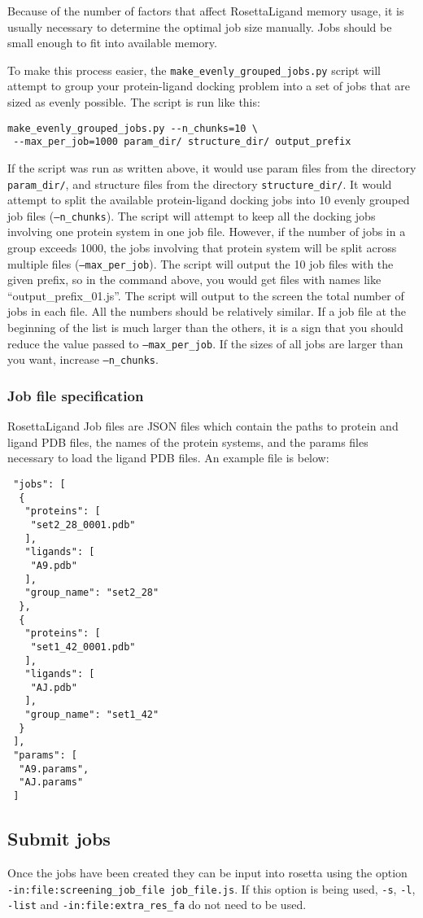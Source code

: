 Because of the number of factors that affect RosettaLigand memory usage, it is usually necessary to determine the optimal job size manually.
Jobs should be small enough to fit into available memory.

To make this process easier, the \texttt{make\_evenly\_grouped\_jobs.py} script will attempt to group your protein-ligand docking problem into a set of jobs that are sized as evenly possible. 
The script is run like this:

\begin{verbatim}
make_evenly_grouped_jobs.py --n_chunks=10 \
 --max_per_job=1000 param_dir/ structure_dir/ output_prefix
\end{verbatim}

If the script was run as written above, it would use param files from the directory \texttt{param\_dir/}, and structure files from the directory \texttt{structure\_dir/}.
It would attempt to split the available protein-ligand docking jobs into 10 evenly grouped job files (\texttt{--n\_chunks}).
The script will attempt to keep all the docking jobs involving one protein system in one job file. However, if the number of jobs in a group exceeds 1000,
the jobs involving that protein system will be split across multiple files (\texttt{--max\_per\_job}). 
The script will output the 10 job files with the given prefix, so in the command above, you would get files with names like ``output\_prefix\_01.js''.
The script will output to the screen the total number of jobs in each file. All the numbers should be relatively similar. 
If a job file at the beginning of the list is much larger than the others, it is a sign that you should reduce the value passed to \texttt{--max\_per\_job}. If the sizes of all jobs are larger than you want, increase \texttt{--n\_chunks}.

\subsubsection{Job file specification}

RosettaLigand Job files are JSON files which contain the paths to protein and ligand PDB files, the names of the protein systems,
and the params files necessary to load the ligand PDB files.
An example file is below:

\begin{verbatim}
 "jobs": [
  {
   "proteins": [
    "set2_28_0001.pdb"
   ],
   "ligands": [
    "A9.pdb"
   ],
   "group_name": "set2_28"
  },
  {
   "proteins": [
    "set1_42_0001.pdb"
   ],
   "ligands": [
    "AJ.pdb"
   ],
   "group_name": "set1_42"
  }
 ],
 "params": [
  "A9.params",
  "AJ.params"
 ]
\end{verbatim}

\subsection{Submit jobs}

Once the jobs have been created they can be input into rosetta using the option\\
\texttt{-in:file:screening\_job\_file job\_file.js}.
If this option is being used, \texttt{-s}, \texttt{-l}, \texttt{-list} and \texttt{-in:file:extra\_res\_fa} do not need to be used.
